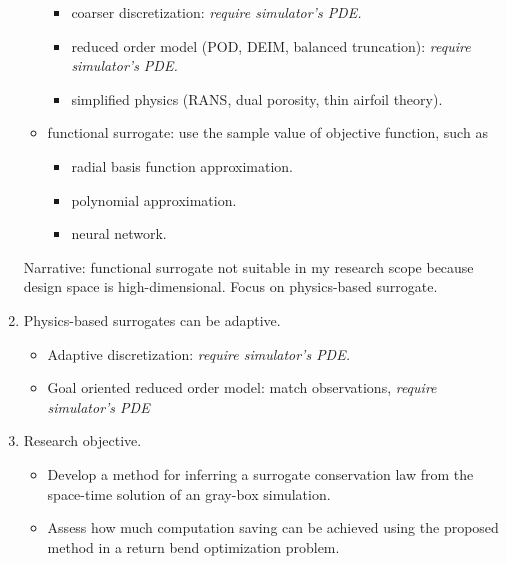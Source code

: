 \documentclass[a4paper,onecolumn]{article}
\theoremstyle{remark}
\begin{document}
\begin{enumerate}
\begin{itemize}
                    \begin{itemize}
                        \item coarser discretization: \emph{require simulator's PDE.}
                        \item reduced order model (POD, DEIM, balanced truncation): \emph{require simulator's PDE.}
                        \item simplified physics (RANS, dual porosity, thin airfoil theory).
                    \end{itemize}
              \item functional surrogate: use the sample value of objective function, such as
                    \begin{itemize}
                        \item radial basis function approximation.
                        \item polynomial approximation.
                        \item neural network.
                    \end{itemize}
          \end{itemize}
          Narrative: functional surrogate not suitable in my research scope because design space is high-dimensional. Focus on physics-based surrogate.
    \item Physics-based surrogates can be adaptive.
          \begin{itemize}
              \item Adaptive discretization: \emph{require simulator's PDE.}
              \item Goal oriented reduced order model: match observations, \emph{require simulator's PDE}
          \end{itemize}
    \item Research objective.
          \begin{itemize}
              \item Develop a method for inferring a surrogate conservation law from the space-time solution
                    of an gray-box simulation.
              \item Assess how much computation saving can be achieved using the proposed method in a return bend optimization problem.
          \end{itemize}
\end{enumerate}
\end{document}
